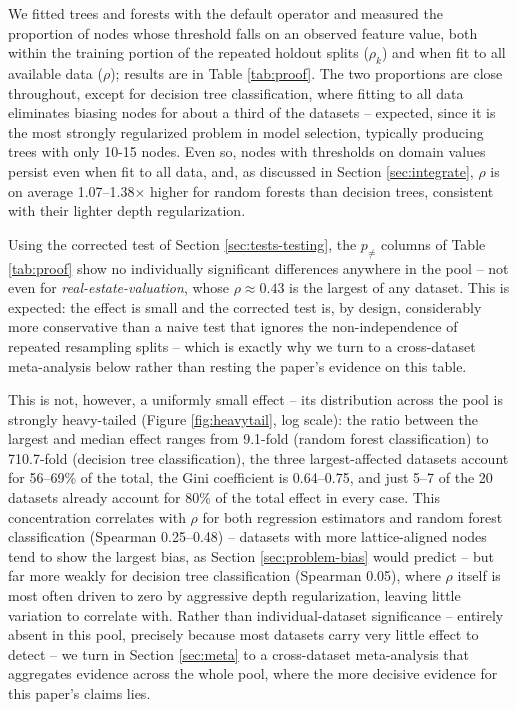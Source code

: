 \documentclass[5p,twocolumn,authoryear]{elsarticle}
\theoremstyle{plain}%
\theoremstyle{remark}%
\theoremstyle{definition}%
\begin{document}
We fitted trees and forests with the default operator and measured the proportion of nodes whose threshold falls on an observed feature value, both within the training portion of the repeated holdout splits ($\rho_k$) and when fit to all available data ($\rho$); results are in Table \ref{tab:proof}. The two proportions are close throughout, except for decision tree classification, where fitting to all data eliminates biasing nodes for about a third of the datasets -- expected, since it is the most strongly regularized problem in model selection, typically producing trees with only 10-15 nodes. Even so, nodes with thresholds on domain values persist even when fit to all data, and, as discussed in Section \ref{sec:integrate}, $\rho$ is on average 1.07--1.38$\times$ higher for random forests than decision trees, consistent with their lighter depth regularization.

Using the corrected test of Section \ref{sec:tests-testing}, the $p_{\neq}$ columns of Table \ref{tab:proof} show no individually significant differences anywhere in the pool -- not even for \emph{real-estate-valuation}, whose $\rho \approx 0.43$ is the largest of any dataset. This is expected: the effect is small and the corrected test is, by design, considerably more conservative than a naive test that ignores the non-independence of repeated resampling splits -- which is exactly why we turn to a cross-dataset meta-analysis below rather than resting the paper's evidence on this table.

This is not, however, a uniformly small effect -- its distribution across the pool is strongly heavy-tailed (Figure \ref{fig:heavytail}, log scale): the ratio between the largest and median effect ranges from 9.1-fold (random forest classification) to 710.7-fold (decision tree classification), the three largest-affected datasets account for 56--69\% of the total, the Gini coefficient is 0.64--0.75, and just 5--7 of the 20 datasets already account for 80\% of the total effect in every case. This concentration correlates with $\rho$ for both regression estimators and random forest classification (Spearman 0.25--0.48) -- datasets with more lattice-aligned nodes tend to show the largest bias, as Section \ref{sec:problem-bias} would predict -- but far more weakly for decision tree classification (Spearman 0.05), where $\rho$ itself is most often driven to zero by aggressive depth regularization, leaving little variation to correlate with. Rather than individual-dataset significance -- entirely absent in this pool, precisely because most datasets carry very little effect to detect -- we turn in Section \ref{sec:meta} to a cross-dataset meta-analysis that aggregates evidence across the whole pool, where the more decisive evidence for this paper's claims lies.
\end{document}
